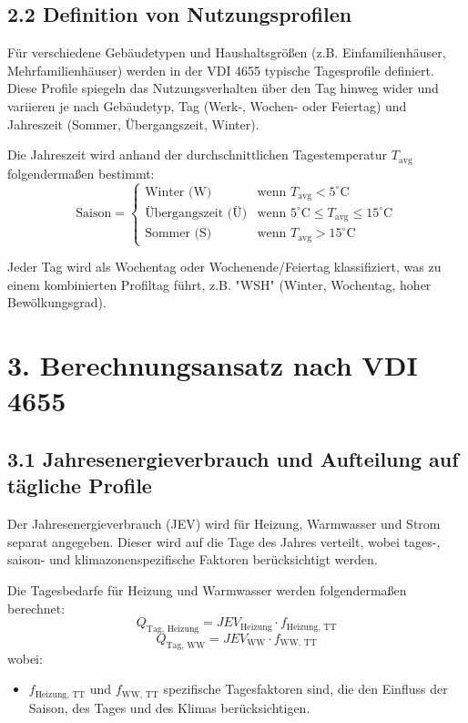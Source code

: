 \documentclass{article}
\begin{document}
\subsection*{2.2 Definition von Nutzungsprofilen}
Für verschiedene Gebäudetypen und Haushaltsgrößen (z.B. Einfamilienhäuser, Mehrfamilienhäuser) werden in der VDI 4655 typische Tagesprofile definiert. Diese Profile spiegeln das Nutzungsverhalten über den Tag hinweg wider und variieren je nach Gebäudetyp, Tag (Werk-, Wochen- oder Feiertag) und Jahreszeit (Sommer, Übergangszeit, Winter).

Die Jahreszeit wird anhand der durchschnittlichen Tagestemperatur \( T_{\text{avg}} \) folgendermaßen bestimmt:
\[
\text{Saison} = 
\begin{cases} 
\text{Winter (W)} & \text{wenn } T_{\text{avg}} < 5^\circ\text{C} \\
\text{Übergangszeit (Ü)} & \text{wenn } 5^\circ\text{C} \leq T_{\text{avg}} \leq 15^\circ\text{C} \\
\text{Sommer (S)} & \text{wenn } T_{\text{avg}} > 15^\circ\text{C} 
\end{cases}
\]

Jeder Tag wird als Wochentag oder Wochenende/Feiertag klassifiziert, was zu einem kombinierten Profiltag führt, z.B. "WSH" (Winter, Wochentag, hoher Bewölkungsgrad).

\section*{3. Berechnungsansatz nach VDI 4655}

\subsection*{3.1 Jahresenergieverbrauch und Aufteilung auf tägliche Profile}
Der Jahresenergieverbrauch (JEV) wird für Heizung, Warmwasser und Strom separat angegeben. Dieser wird auf die Tage des Jahres verteilt, wobei tages-, saison- und klimazonenspezifische Faktoren berücksichtigt werden. 

Die Tagesbedarfe für Heizung und Warmwasser werden folgendermaßen berechnet:
\[
Q_{\text{Tag, Heizung}} = JEV_{\text{Heizung}} \cdot f_{\text{Heizung, TT}} 
\]
\[
Q_{\text{Tag, WW}} = JEV_{\text{WW}} \cdot f_{\text{WW, TT}} 
\]
wobei:
\begin{itemize}
    \item \( f_{\text{Heizung, TT}} \) und \( f_{\text{WW, TT}} \) spezifische Tagesfaktoren sind, die den Einfluss der Saison, des Tages und des Klimas berücksichtigen.
\end{itemize}
\end{document}
